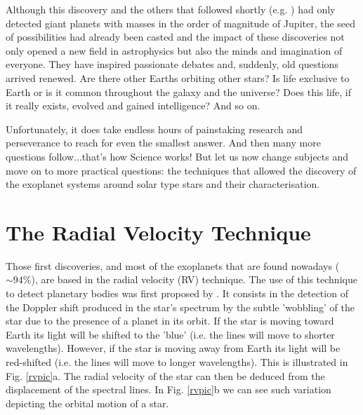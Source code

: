 \documentclass[dvips,12pt,a4paper]{report}
\begin{document}
\indent Although this discovery and the others that followed shortly (e.g. \citeauthor{Marcy-1996} \citeyear{Marcy-1996}) had only detected giant planets with masses in the order of magnitude of Jupiter, the seed of possibilities had already been casted and the impact of these discoveries not only  opened a new field in astrophysics but also the minds and imagination of everyone. They have inspired passionate debates and, suddenly, old questions arrived renewed. Are there other Earths orbiting other stars? Is life exclusive to Earth or is it common throughout the galaxy and the universe? Does this life, if it really exists, evolved and gained intelligence? And so on. 

Unfortunately, it does take endless hours of painstaking research and perseverance to reach for even the smallest answer. And then many more questions follow...that's how Science works! But let us now change subjects and move on to more practical questions: the techniques that allowed the discovery of the exoplanet systems around solar type stars and their characterisation.


\section{The Radial Velocity Technique}

Those first discoveries, and most of the exoplanets that are found nowadays ($\sim 94\%$), are based in the radial velocity (RV) technique. The use of this technique to detect planetary bodies was first proposed by \citet{Struve-1952}. It consists in the detection of the Doppler shift produced in the star's spectrum  by the subtle 'wobbling' of the star due to the presence of a planet in its orbit. If the star is moving toward Earth its light will be shifted to the 'blue' (i.e. the lines will move to shorter wavelengths). However, if the star is moving away from Earth its light will be red-shifted (i.e. the lines will move to longer wavelengths). This is illustrated in Fig. \ref{rvpic}a. The radial velocity of the star can then be deduced from the displacement of the spectral lines. In Fig. \ref{rvpic}b we can see such variation depicting the orbital motion of a star. 
\end{document}
